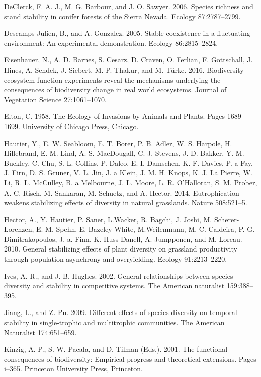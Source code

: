 \documentclass[12pt,]{article}
\begin{document}
DeClerck, F. A. J., M. G. Barbour, and J. O. Sawyer. 2006. Species
richness and stand stability in conifer forests of the Sierra Nevada.
Ecology 87:2787--2799.

Descamps-Julien, B., and A. Gonzalez. 2005. Stable coexistence in a
fluctuating environment: An experimental demonstration. Ecology
86:2815--2824.

Eisenhauer, N., A. D. Barnes, S. Cesarz, D. Craven, O. Ferlian, F.
Gottschall, J. Hines, A. Sendek, J. Siebert, M. P. Thakur, and M.
T{ü}rke. 2016. Biodiversity-ecosystem function experiments reveal the
mechanisms underlying the consequences of biodiversity change in real
world ecosystems. Journal of Vegetation Science 27:1061--1070.

Elton, C. 1958. The Ecology of Invasions by Animals and Plants. Pages
1689--1699. University of Chicago Press, Chicago.

Hautier, Y., E. W. Seabloom, E. T. Borer, P. B. Adler, W. S. Harpole, H.
Hillebrand, E. M. Lind, A. S. MacDougall, C. J. Stevens, J. D. Bakker,
Y. M. Buckley, C. Chu, S. L. Collins, P. Daleo, E. I. Damschen, K. F.
Davies, P. a Fay, J. Firn, D. S. Gruner, V. L. Jin, J. a Klein, J. M. H.
Knops, K. J. {La Pierre}, W. Li, R. L. McCulley, B. a Melbourne, J. L.
Moore, L. R. O'Halloran, S. M. Prober, A. C. Risch, M. Sankaran, M.
Schuetz, and A. Hector. 2014. Eutrophication weakens stabilizing effects
of diversity in natural grasslands. Nature 508:521--5.

Hector, A., Y. Hautier, P. Saner, L.Wacker, R. Bagchi, J. Joshi, M.
Scherer-Lorenzen, E. M. Spehn, E. Bazeley-White, M.Weilenmann, M. C.
Caldeira, P. G. Dimitrakopoulos, J. a. Finn, K. Huss-Danell, A.
Jumpponen, and M. Loreau. 2010. General stabilizing effects of plant
diversity on grassland productivity through population asynchrony and
overyielding. Ecology 91:2213--2220.

Ives, A. R., and J. B. Hughes. 2002. General relationships between
species diversity and stability in competitive systems. The American
naturalist 159:388--395.

Jiang, L., and Z. Pu. 2009. Different effects of species diversity on
temporal stability in single-trophic and multitrophic communities. The
American Naturalist 174:651--659.

Kinzig, A. P., S. W. Pacala, and D. Tilman (Eds.). 2001. The functional
consequences of biodiversity: Empirical progress and theoretical
extensions. Pages i--365. Princeton University Press, Princeton.
\end{document}
